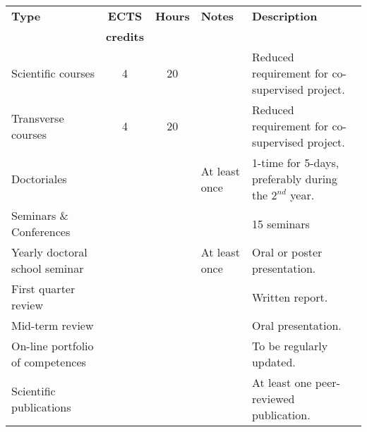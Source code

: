 \begin{table}[h!]
  \centering
  \scriptsize
    \begin{tabularx}{\textwidth}{p{}ccXp{}}
    \toprule
  \textbf{Type} & \textbf{ECTS}&\textbf{Hours}&\textbf{Notes}&\textbf{Description} \\
  & \textbf{credits}&&&\\
    \midrule
   Scientific courses&4&20&&Reduced requirement for co-supervised project.\\
   Transverse courses&4&20&&Reduced requirement for co-supervised project.\\
   Doctoriales&&&At least once&1-time for 5-days, preferably during the $2^{nd}$ year.\\
   Seminars \& Conferences&&&&15 seminars\\
   Yearly doctoral school seminar&&&At least once&Oral or poster presentation.\\
   First quarter review&&&& Written report.\\
   Mid-term review&&&&Oral presentation.\\
   On-line portfolio of competences&&&&To be regularly updated.\\
   Scientific publications&&&&At least one peer-reviewed publication.\\
    \bottomrule
    \end{tabularx}%
  \label{tab:emma_tab}%
\end{table}%